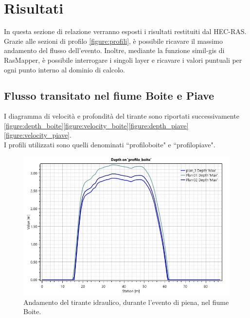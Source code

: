 \section{Risultati}
In questa sezione di relazione verranno esposti i risultati restituiti dal HEC-RAS.\\
Grazie alle sezioni di profilo \eqref{figure:profili}, è possibile ricavare il massimo andamento del flusso dell'evento. Inoltre, mediante la funzione simil-gis di RasMapper, è possibile interrogare i singoli layer e ricavare i valori puntuali per ogni punto interno al dominio di calcolo.

\subsection{Flusso transitato nel fiume Boite e Piave}
I diagramma di velocità e profondità del tirante sono riportati successivamente \eqref{figure:depth_boite}\eqref{figure:velocity_boite}\eqref{figure:depth_piave}\eqref{figure:velocity_piave}.\\
I profili utilizzati sono quelli denominati ``profilo\textunderscore boite" e ``profilo\textunderscore piave".

\begin{figure}[H] \centering
    \includegraphics[scale=0.5]{immagini/depth_boite.JPG}
    \caption{Andamento del tirante idraulico, durante l'evento di piena, nel fiume Boite.}
    \label{figure:depth_boite}
\end{figure}

